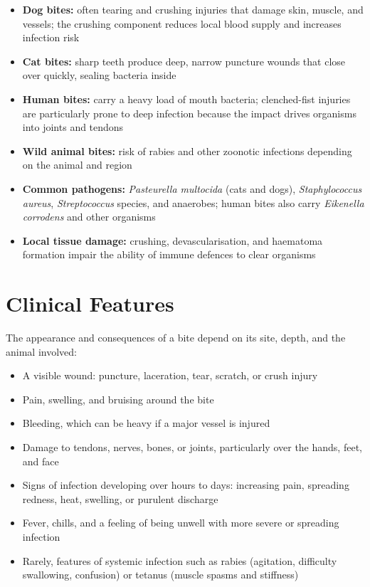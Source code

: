 \begin{itemize}
    \item \textbf{Dog bites:} often tearing and crushing injuries that damage skin, muscle, and vessels; the crushing component reduces local blood supply and increases infection risk
    \item \textbf{Cat bites:} sharp teeth produce deep, narrow puncture wounds that close over quickly, sealing bacteria inside
    \item \textbf{Human bites:} carry a heavy load of mouth bacteria; clenched-fist injuries are particularly prone to deep infection because the impact drives organisms into joints and tendons
    \item \textbf{Wild animal bites:} risk of rabies and other zoonotic infections depending on the animal and region
    \item \textbf{Common pathogens:} \textit{Pasteurella multocida} (cats and dogs), \textit{Staphylococcus aureus}, \textit{Streptococcus} species, and anaerobes; human bites also carry \textit{Eikenella corrodens} and other organisms
    \item \textbf{Local tissue damage:} crushing, devascularisation, and haematoma formation impair the ability of immune defences to clear organisms
\end{itemize}

\section*{Clinical Features}
The appearance and consequences of a bite depend on its site, depth, and the animal involved:

\begin{itemize}
    \item A visible wound: puncture, laceration, tear, scratch, or crush injury
    \item Pain, swelling, and bruising around the bite
    \item Bleeding, which can be heavy if a major vessel is injured
    \item Damage to tendons, nerves, bones, or joints, particularly over the hands, feet, and face
    \item Signs of infection developing over hours to days: increasing pain, spreading redness, heat, swelling, or purulent discharge
    \item Fever, chills, and a feeling of being unwell with more severe or spreading infection
    \item Rarely, features of systemic infection such as rabies (agitation, difficulty swallowing, confusion) or tetanus (muscle spasms and stiffness)
\end{itemize}

